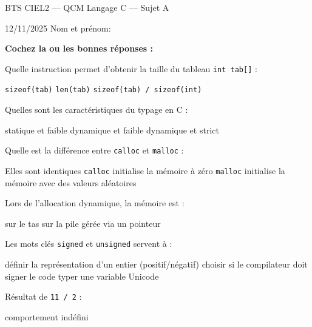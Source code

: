 \documentclass[12pt, a4paper]{exam}
\begin{document}

\begin{center}
\Large BTS CIEL2 — QCM Langage C — Sujet A
\end{center}
\begin{center}
12/11/2025 \hfill Nom et prénom:\enspace \hrulefill
\end{center}

\textbf{Cochez la ou les bonnes réponses :}

\begin{questions}

\question Quelle instruction permet d’obtenir la taille du tableau \texttt{int tab[]} :
\begin{checkboxes}
 \choice \texttt{sizeof(tab)}
 \choice \texttt{len(tab)}
 \CorrectChoice \texttt{sizeof(tab) / sizeof(int)}
\end{checkboxes}

\question Quelles sont les caractéristiques du typage en C :
\begin{checkboxes}
 \CorrectChoice statique et faible
 \choice dynamique et faible
 \choice dynamique et strict
\end{checkboxes}

\question Quelle est la différence entre \texttt{calloc} et \texttt{malloc} :
\begin{checkboxes}
 \choice Elles sont identiques
 \CorrectChoice \texttt{calloc} initialise la mémoire à zéro
 \choice \texttt{malloc} initialise la mémoire avec des valeurs aléatoires
\end{checkboxes}

\question Lors de l’allocation dynamique, la mémoire est :
\begin{checkboxes}
 \CorrectChoice sur le tas
 \choice sur la pile
 \CorrectChoice gérée via un pointeur
\end{checkboxes}

\question Les mots clés \texttt{signed} et \texttt{unsigned} servent à :
\begin{checkboxes}
 \CorrectChoice définir la représentation d’un entier (positif/négatif)
 \choice choisir si le compilateur doit signer le code
 \choice typer une variable Unicode
\end{checkboxes}

\question Résultat de \texttt{11 / 2} :
\begin{checkboxes}
 \choice comportement indéfini
\end{checkboxes}


\end{questions}
\end{document}
